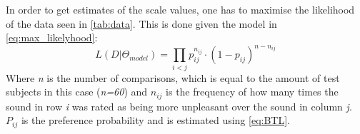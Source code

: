 In order to get estimates of the scale values, one has to maximise the likelihood of the data seen in \autoref{tab:data}. This is done given the model in \autoref{eq:max_likelyhood}: 
%
\begin{equation}
L(D|\Theta_{model}) = \prod_{i<j} p_{ij} ^{n_{ij}}\cdot(1- p_{ij})^{n-n_{ij}}
\label{eq:max_likelyhood}
\end{equation}
\noindent 
%
Where \textit{n} is the number of comparisons, which is equal to the amount of test subjects in this case (\textit{n=60}) and $n_{ij}$ is the frequency of how many times the sound in row \textit{i} was rated as being more unpleasant over the sound in column \textit{j}. $P_{ij}$ is the preference probability and is estimated using \autoref{eq:BTL}. 
\vfill
